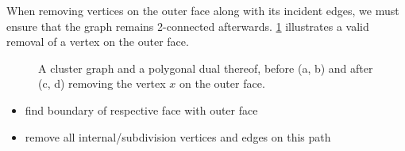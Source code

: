 When removing vertices on the outer face along with its incident edges, we must ensure that the graph remains 2-connected afterwards. \cref{fig:remove-external-vertex-example} illustrates a valid removal of a vertex on the outer face.

\begin{figure}[H]
	\centering
	\quad
	\qquad
	\quad
	\caption{A cluster graph and a polygonal dual thereof, before (a, b) and after (c, d) removing the vertex $x$ on the outer face.}
	\label{fig:remove-external-vertex-example}
\end{figure}

\begin{itemize}
	\item find boundary of respective face with outer face
	\item remove all internal/subdivision vertices and edges on this path
\end{itemize}

\lipsum
